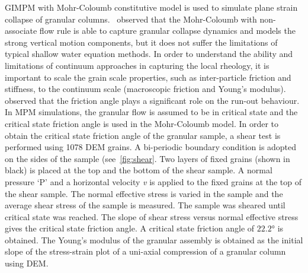 GIMPM with Mohr-Coloumb constitutive model is used to simulate plane strain 
collapse of granular columns.~\citet{Crosta2009} observed that the Mohr-Coloumb 
with non-associate flow rule is able to capture granular collapse dynamics and 
models the strong vertical motion components, but it does not suffer the 
limitations of typical shallow water equation methods. In order to understand 
the ability and limitations of continuum approaches in capturing the local 
rheology, it is important to scale the grain scale properties, such as 
inter-particle friction and stiffness, to the continuum 
scale (macroscopic friction and Young's modulus).~\citet{Crosta2009} observed 
that the friction angle plays a significant role on the run-out behaviour. In 
MPM simulations, the granular flow is assumed to be in critical state and the 
critical state friction angle is used in the Mohr-Coloumb model. In order to 
obtain the critical state friction angle of the granular sample, a shear test 
is performed using 1078 DEM grains. A bi-periodic boundary condition is adopted 
on the sides of the sample (see~\cref{fig:shear}. Two layers of fixed grains 
(shown in black) is placed at the top and the bottom of the shear sample. A 
normal pressure `P' and a horizontal velocity \textit{v} is applied to the 
fixed grains  at the top of 
the shear sample. The normal effective stress is varied in the sample and the 
average shear stress of the sample is measured. The sample was sheared until 
critical state was reached. The slope of shear stress 
versus normal effective stress gives the critical state friction angle. A 
critical state friction angle of $22.2$\si{\degree} is obtained. The Young's 
modulus of the granular assembly is obtained as the initial slope of the 
stress-strain plot of a uni-axial compression of a granular column using DEM.

